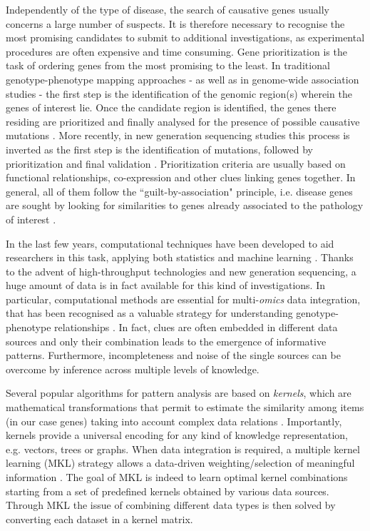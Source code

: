 \documentclass[twocolumn]{bmcart}%
\begin{document}
Independently of the type of disease, the search of causative genes usually concerns a large number of suspects. It is therefore necessary to recognise the most promising candidates to submit to additional investigations, as experimental procedures are often expensive and time consuming. Gene prioritization is the task of ordering genes from the most promising to the least. In traditional genotype-phenotype mapping approaches - as well as in genome-wide association studies - the first step is the identification of the genomic region(s) wherein the genes of interest lie. Once the candidate region is identified, the genes there residing are prioritized and finally analysed for the presence of possible causative mutations \cite{strachan}. More recently, in new generation sequencing studies this process is inverted as the first step is the identification of mutations, followed by prioritization and final validation \cite{salgado}. Prioritization criteria are usually based on functional relationships, co-expression and other clues linking genes together. In general, all of them follow the ``guilt-by-association" principle, i.e. disease genes are sought by looking for similarities to genes already associated to the pathology of interest \cite{strachan}.

In the last few years, computational techniques have been developed to aid researchers in this task, applying both statistics and machine learning \cite{moreau}. Thanks to the advent of high-throughput technologies and new generation sequencing, a huge amount of data is in fact available for this kind of investigations. In particular, computational methods are essential for multi-\emph{omics} data integration, that has been recognised as a valuable strategy for understanding genotype-phenotype relationships \cite{ritchie}. In fact, clues are often embedded in different data sources and only their combination leads to the emergence of informative patterns. Furthermore, incompleteness and noise of the single sources can be overcome by inference across multiple levels of knowledge.

Several popular algorithms for pattern analysis are based on \emph{kernels}, which are mathematical transformations that permit to estimate the similarity among items (in our case genes) taking into account complex data relations \cite{cristianini}. Importantly, kernels provide a universal encoding for any kind of knowledge representation, e.g. vectors, trees or graphs. When data integration is required, a multiple kernel learning (MKL) strategy allows a data-driven weighting/selection of meaningful information \cite{gonen}. The goal of MKL is indeed to learn optimal kernel combinations starting from a set of predefined kernels obtained by various data sources. Through MKL the issue of combining different data types is then solved by converting each dataset in a kernel matrix.
\end{document}
